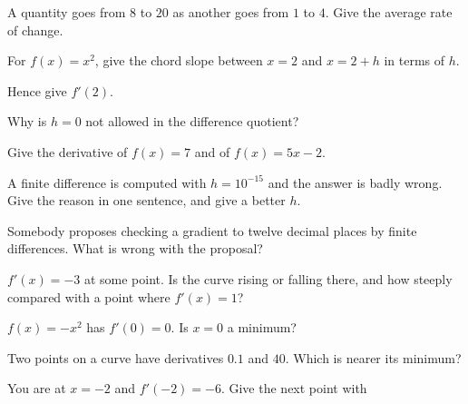 \begin{testexercises}
\item A quantity goes from $8$ to $20$ as another goes from $1$ to $4$. Give
  the average rate of change.
\item For $f(x) = x^{2}$, give the chord slope between $x = 2$ and $x = 2 + h$
  in terms of $h$.
\item Hence give $f'(2)$.
\item Why is $h = 0$ not allowed in the difference quotient?
\item Give the derivative of $f(x) = 7$ and of $f(x) = 5x - 2$.
\item A finite difference is computed with $h = 10^{-15}$ and the answer is
  badly wrong. Give the reason in one sentence, and give a better $h$.
\item Somebody proposes checking a gradient to twelve decimal places by finite
  differences. What is wrong with the proposal?
\item $f'(x) = -3$ at some point. Is the curve rising or falling there, and
  how steeply compared with a point where $f'(x) = 1$?
\item $f(x) = -x^{2}$ has $f'(0) = 0$. Is $x = 0$ a minimum?
\item Two points on a curve have derivatives $\num{0.1}$ and $\num{40}$. Which
  is nearer its minimum?
\item You are at $x = -2$ and $f'(-2) = -6$. Give the next point with

\end{testexercises}
